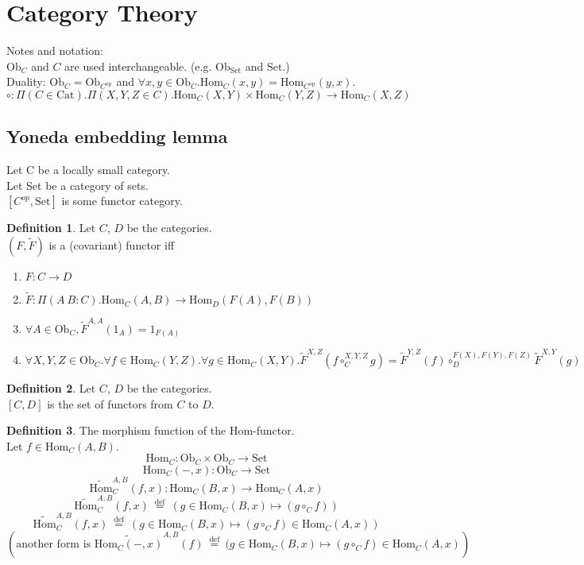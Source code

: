 \documentclass[10pt,a4paper]{article}
\theoremstyle{definition}
\newtheorem{definition}{Definition}[section]
\newcommand{\Ob}{{\textrm{Ob}}}
\newcommand{\Cat}{{\textrm{Cat}}}
\newcommand{\Hom}{{\textrm{Hom}}}
\newcommand{\HomMor}{{\widetilde{\Hom}\textrm{}}}
\newcommand{\FMor}{{\widetilde{F}\textrm{}}}
\newcommand{\op}{{\textrm{op}}}
\newcommand{\defi}{{\textrm{def}}}
\newcommand{\eqdef}{{\ \stackrel{\defi}{=}\ }}
\newcommand{\Set}{{\textrm{Set}}}
\begin{document}
\section{Category Theory}
Notes and notation:\\
$\Ob_C$ and $C$ are used interchangeable. (e.g. $\Ob_\Set$ and $\Set$.)\\
Duality: $\Ob_C = \Ob_{C^\op}$ and 
 $\forall x,y \in \Ob_C. \Hom_C(x,y) = \Hom_{C^\op}(y,x)$.\\
$\circ : \Pi(C\in \Cat).\Pi(X,Y,Z\in C).\Hom_C(X,Y)\times\Hom_C(Y,Z)\to\Hom_C(X,Z)$

\subsection{Yoneda embedding lemma}
Let C be a locally small category.\\
Let Set be a category of sets.\\
$[C^{op},\textrm{Set}]$ is some functor category.\\

\begin{definition}
Let $C$, $D$ be the categories.\\
 $(F, \FMor)$ is a (covariant) functor iff\\
\begin{enumerate}
\item $F:C \to D$
\item $\FMor:\Pi(A\ B:C).\Hom_C(A,B) \to \Hom_D(F(A), F(B))$
\item $\forall A\in \Ob_C, \FMor^{A,A}(1_A)=1_{F(A)}$
\item $\forall X,Y,Z \in \Ob_C.\forall f\in\Hom_C(Y,Z).\forall g\in\Hom_C(X,Y). \FMor^{X,Z}(f\circ_C^{X,Y,Z} g)=\FMor^{Y,Z}(f)\circ_D^{F(X),F(Y),F(Z)} \FMor^{X,Y}(g)$
\end{enumerate}

\end{definition}

\begin{definition}
Let $C$, $D$ be the categories.\\
$[C,D]$ is the set of functors from $C$ to $D$.\\
\end{definition}

\begin{definition} The morphism function of the Hom-functor.\\
Let $f\in\Hom_{C}(A,B)$.
$$\Hom_C: \Ob_C \times \Ob_C \to \Set$$
$$\Hom_C(-,x): \Ob_C \to \Set$$
$$\HomMor^{A,B}_C(f,x) : \Hom_C(B,x) \to \Hom_C(A,x)$$
$$\HomMor^{A,B}_C(f,x) \eqdef (g \in\Hom_C(B,x) \mapsto (g \circ_C f))$$
$$\HomMor^{A,B}_C(f,x) \eqdef (g \in\Hom_C(B,x) \mapsto (g \circ_C f) \in\Hom_C(A,x))$$
$$\left(\textrm{another form is }\widetilde{\Hom_C(-,x)}^{A,B}(f) \eqdef (g \in\Hom_C(B,x) \mapsto (g \circ_C f) \in\Hom_C(A,x)\right)$$
\end{definition}
\end{document}

